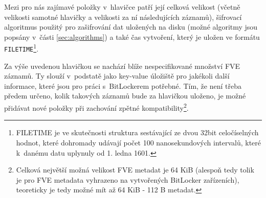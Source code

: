 
Mezi pro nás zajímavé položky v~hlavičce patří její celková velikost (včetně velikosti samotné hlavičky a velikosti za ní následujících záznamů), šifrovací algoritmus použitý pro zašifrování dat uložených na disku (možné algoritmy jsou popsány v~části \ref{sec:algorithms}) a také čas vytvoření, který je uložen ve formátu \texttt{FILETIME}\footnote{FILETIME je ve skutečnosti struktura sestávající ze dvou 32bit celočíselných hodnot, které dohromady udávají počet 100 nanosekundových intervalů, které k~danému datu uplynuly od 1. ledna 1601.\cite{Zxwr6wjYZUQ6z8Yp}}.

\label{sec:fve-metadata-entry}

Za výše uvedenou hlavičkou se nachází blíže nespecifikované množství FVE záznamů. Ty slouží v~podstatě jako key-value úložiště pro jakékoli další informace, které jsou pro práci s~BitLockerem potřebné. Tím, že není třeba předem určeno, kolik takových záznamů bude za hlavičkou uloženo, je možné přidávat nové položky při zachování zpětné kompatibility\footnote{Celková největší možná velikost FVE metadat je 64 KiB (alespoň tedy tolik je pro FVE metadata vyhrazeno na vytvořených BitLocker zařízeních), teoreticky je tedy možné mít až 64 KiB - 112 B metadat.}.

